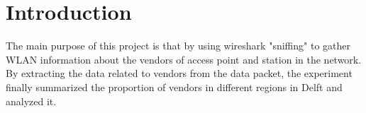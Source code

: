 \section{Introduction}
The main purpose of this project is that by using wireshark "sniffing" to gather WLAN information about the vendors of access point and station in the network. By extracting the data related to vendors from the data packet, the experiment finally summarized the proportion of vendors in different regions in Delft and analyzed it.
